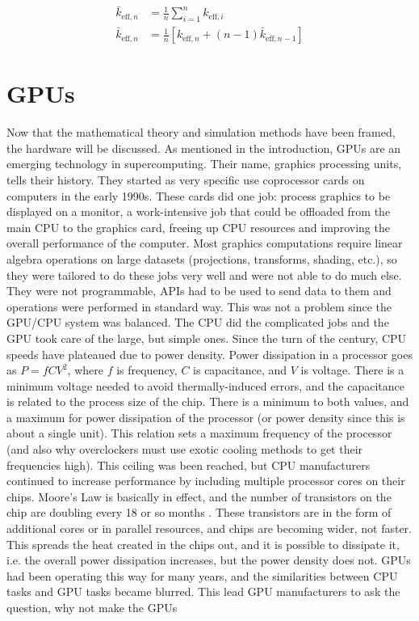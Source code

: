 \begin{equation}
\label{k_eff_final}
\begin{split}
\bar{k}_{\mathrm{eff},n} &= \frac{1}{n} \sum_{i=1}^{n} k_{\mathrm{eff},i} \\
\bar{k}_{\mathrm{eff},n} &= \frac{1}{n} \left[ k_{\mathrm{eff},n} + (n-1) \bar{k}_{\mathrm{eff},n-1}  \right]
\end{split}
\end{equation}



\section{GPUs}

Now that the mathematical theory and simulation methods have been framed, the hardware will be discussed.  As mentioned in the introduction, GPUs are an emerging technology in supercomputing.  Their name, graphics processing units, tells their history.  They started as very specific use coprocessor cards on computers in the early 1990s.  These cards did one job:  process graphics to be displayed on a monitor, a work-intensive job that could be offloaded from the main CPU to the graphics card, freeing up CPU resources and improving the overall performance of the computer.  Most graphics computations require linear algebra operations on large datasets (projections, transforms, shading, etc.), so they were tailored to do these jobs very well and were not able to do much else.  They were not programmable, APIs had to be used to send data to them and operations were performed in standard way.  This was not a problem since the GPU/CPU system was balanced.  The CPU did the complicated jobs and the GPU took care of the large, but simple ones.  Since the turn of the century, CPU speeds have plateaued due to power density.  Power dissipation in a processor goes as $P=fCV^2$, where $f$ is frequency, $C$ is capacitance, and $V$ is voltage.  There is a minimum voltage needed to avoid thermally-induced errors, and the capacitance is related to the process size of the chip.  There is a minimum to both values, and a maximum for power dissipation of the processor (or power density since this is about a single unit).  This relation sets a maximum frequency of the processor (and also why overclockers must use exotic cooling methods to get their frequencies high).  This ceiling was been reached, but CPU manufacturers continued to increase performance by including multiple processor cores on their chips.  Moore's Law is basically in effect, and the number of transistors on the chip are doubling every 18 or so months \cite{moore}.  These transistors are in the form of additional cores or in parallel resources, and chips are becoming wider, not faster.  This spreads the heat created in the chips out, and it is possible to dissipate it, i.e. the overall power dissipation increases, but the power density does not.  GPUs had been operating this way for many years, and the similarities between CPU tasks and GPU tasks became blurred.  This lead GPU manufacturers to ask the question, why not make the GPUs 